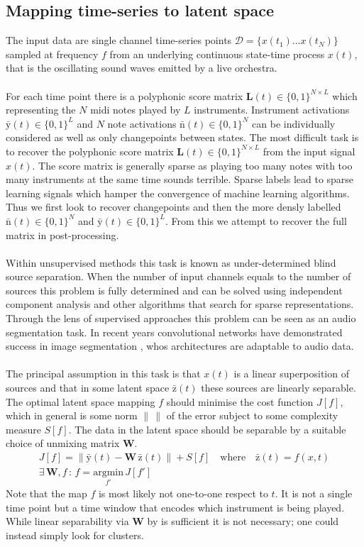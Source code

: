 \documentclass{article}[12pt]
\numberwithin{equation}{section}
\begin{document}
\subsection{Mapping time-series to latent space}
The input data are single channel time-series points $\mathcal{D}=\{x(t_1)\dots
x(t_N)\}$ sampled at frequency $f$ from an underlying continuous state-time
process $x(t)$, that is the oscillating sound waves emitted by a live orchestra.
\\\\
For each time point there is a polyphonic score matrix $\mathbf{L}(t)\in\{0,1\}^{N\times L}$ which
representing the $N$ midi notes played by $L$ instruments. Instrument activations
$\bar{\mathrm{y}}(t)\in\{0,1\}^L$ and $N$ note activations
$\bar{\mathrm{n}}(t)\in\{0,1\}^N$ can be individually considered as well as only
changepoints between states.
\noindent
The most difficult task is to recover the polyphonic score matrix
$\mathbf{L}(t)\in\{0,1\}^{N\times L}$ from the input signal $x(t)$. The score matrix
is generally sparse as playing too many notes with too many instruments at the
same time sounds terrible. Sparse labels lead to sparse learning signals which
hamper the convergence of machine learning algorithms. Thus we first look to
recover changepoints and then the more densly labelled $\bar{\mathrm{n}}(t)\in\{0,1\}^N$
and $\bar{\mathrm{y}}(t)\in\{0,1\}^L$.
From this we attempt to recover the full matrix in post-processing.
\\\\
Within unsupervised methods this task is known as
under-determined blind source separation. When the number of input channels
equals to the number of sources this problem is fully determined and can be
solved using independent component analysis
\cite{Platt1995Information-MaximizationDeconvolution} and other algorithms
that search for sparse representations. Through the lens of supervised approaches
this problem can be seen as an audio segmentation task. In recent years
convolutional networks have demonstrated success in image segmentation \cite{},
whos architectures are adaptable to audio data.
\\\\
The principal assumption in this task is that $x(t)$ is a linear superposition
of sources and that in some latent space $\bar{\mathrm{z}}(t)$ these sources are
linearly separable. The optimal latent space mapping $f$ should minimise the
cost function $J[f]$, which in general is some norm $\left\lVert\,\right\rVert$
of the error subject to some complexity measure $S[f]$. The data in the latent
space should be separable by a suitable choice of unmixing matrix $\mathbf{W}$.
\begin{align}
	J[f]=\left\lVert\bar{\mathrm{y}}(t)-\mathbf{W}\,\bar{\mathrm{z}}(t)\right\rVert+S[f]
	\quad\text{where}\quad
	\bar{\mathrm{z}}(t) = f(x,t)\\
	\exists\,\mathbf{W},f\,:\,f=\underset{f'}{\mathrm{argmin}}\,J[f']
	\qquad\qquad\qquad
\end{align}
Note that the map $f$ is most likely not one-to-one respect to $t$. It is not a
single time point but a time window that encodes which instrument is being
played. While linear separability via $\mathbf{W}$ by is sufficient it is not
necessary; one could instead simply look for clusters.
\end{document}
